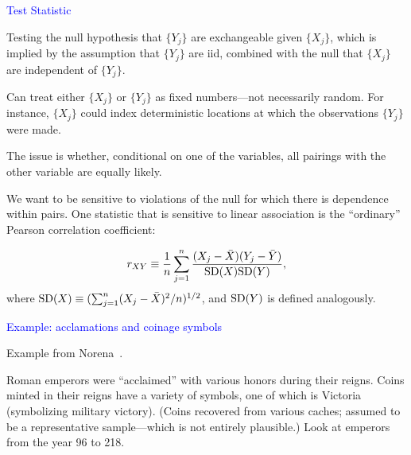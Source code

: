 \documentclass[landscape]{slides}
\newcommand{\SD}{{\rm SD}}
\newcommand{\beq}{\begin{equation}}
\newcommand{\eeq}{\end{equation}}
\begin{document}
\begin{slide}
{\textcolor{blue}{Test Statistic}}

Testing the null hypothesis that $\{ Y_j \}$ are exchangeable given $\{X_j\}$,
which is implied by the assumption that $\{Y_j\}$ are iid, combined with the
null that $\{ X_j \}$ are independent of $\{Y_j\}$.

Can treat either $\{ X_j \}$ or $\{ Y_j \}$ as fixed numbers---not necessarily random.
For instance, $\{X_j \}$ could index deterministic locations at which the observations
$\{Y_j\}$ were made.

The issue is whether, conditional on one of the variables, all pairings with the other
variable are equally likely.

We want to be sensitive to violations of the null for which there is dependence within pairs.
One statistic that is sensitive to linear association is the ``ordinary''
Pearson correlation coefficient:

\beq
   r_{XY} \equiv \frac{1}{n} \sum_{j=1}^n \frac{ (X_j - \bar{X})(Y_j - \bar{Y})}{\SD(X) \SD(Y)},
\eeq
where $\SD(X) \equiv (\sum_{j=1}^n (X_j - \bar{X})^2/n)^{1/2}$, and $\SD(Y)$ 
is defined analogously.

\end{slide}

\begin{slide}
{\textcolor{blue}{Example: acclamations and coinage symbols}}

Example from Norena~\cite{norena10}.

Roman emperors were ``acclaimed'' with various honors during their reigns.
Coins minted in their reigns have a variety of symbols, one of which is Victoria (symbolizing
military victory).
(Coins recovered from various caches; assumed to be a representative sample---which
is not entirely plausible.)
Look at emperors from the year 96 to 218.

\end{slide}
\end{document}
